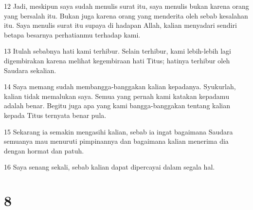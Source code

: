 \par 12 Jadi, meskipun saya sudah menulis surat itu, saya menulis bukan karena orang yang bersalah itu. Bukan juga karena orang yang menderita oleh sebab kesalahan itu. Saya menulis surat itu supaya di hadapan Allah, kalian menyadari sendiri betapa besarnya perhatianmu terhadap kami.
\par 13 Itulah sebabnya hati kami terhibur. Selain terhibur, kami lebih-lebih lagi digembirakan karena melihat kegembiraan hati Titus; hatinya terhibur oleh Saudara sekalian.
\par 14 Saya memang sudah membangga-banggakan kalian kepadanya. Syukurlah, kalian tidak memalukan saya. Semua yang pernah kami katakan kepadamu adalah benar. Begitu juga apa yang kami bangga-banggakan tentang kalian kepada Titus ternyata benar pula.
\par 15 Sekarang ia semakin mengasihi kalian, sebab ia ingat bagaimana Saudara semuanya mau menuruti pimpinannya dan bagaimana kalian menerima dia dengan hormat dan patuh.
\par 16 Saya senang sekali, sebab kalian dapat dipercayai dalam segala hal.

\chapter{8}

